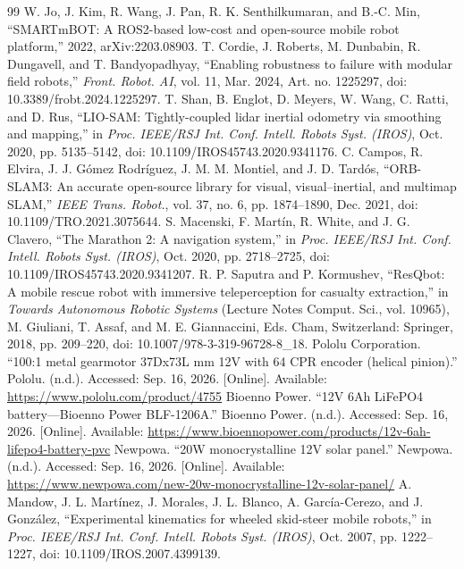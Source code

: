 \begin{thebibliography}{99}
W. Jo, J. Kim, R. Wang, J. Pan, R. K. Senthilkumaran, and B.-C. Min, ``SMARTmBOT: A ROS2-based low-cost and open-source mobile robot platform,'' 2022, arXiv:2203.08903.
T. Cordie, J. Roberts, M. Dunbabin, R. Dungavell, and T. Bandyopadhyay, ``Enabling robustness to failure with modular field robots,'' \textit{Front. Robot. AI}, vol. 11, Mar. 2024, Art. no. 1225297, doi: 10.3389/frobt.2024.1225297.
T. Shan, B. Englot, D. Meyers, W. Wang, C. Ratti, and D. Rus, ``LIO-SAM: Tightly-coupled lidar inertial odometry via smoothing and mapping,'' in \textit{Proc. IEEE/RSJ Int. Conf. Intell. Robots Syst. (IROS)}, Oct. 2020, pp. 5135--5142, doi: 10.1109/IROS45743.2020.9341176.
C. Campos, R. Elvira, J. J. G\'{o}mez Rodr\'{i}guez, J. M. M. Montiel, and J. D. Tard\'{o}s, ``ORB-SLAM3: An accurate open-source library for visual, visual--inertial, and multimap SLAM,'' \textit{IEEE Trans. Robot.}, vol. 37, no. 6, pp. 1874--1890, Dec. 2021, doi: 10.1109/TRO.2021.3075644.
S. Macenski, F. Mart\'{i}n, R. White, and J. G. Clavero, ``The Marathon 2: A navigation system,'' in \textit{Proc. IEEE/RSJ Int. Conf. Intell. Robots Syst. (IROS)}, Oct. 2020, pp. 2718--2725, doi: 10.1109/IROS45743.2020.9341207.
R. P. Saputra and P. Kormushev, ``ResQbot: A mobile rescue robot with immersive teleperception for casualty extraction,'' in \textit{Towards Autonomous Robotic Systems} (Lecture Notes Comput. Sci., vol. 10965), M. Giuliani, T. Assaf, and M. E. Giannaccini, Eds. Cham, Switzerland: Springer, 2018, pp. 209--220, doi: 10.1007/978-3-319-96728-8\_18.
Pololu Corporation. ``100:1 metal gearmotor 37Dx73L mm 12V with 64 CPR encoder (helical pinion).'' Pololu. (n.d.). Accessed: Sep. 16, 2026. [Online]. Available: \url{https://www.pololu.com/product/4755}
Bioenno Power. ``12V 6Ah LiFePO4 battery---Bioenno Power BLF-1206A.'' Bioenno Power. (n.d.). Accessed: Sep. 16, 2026. [Online]. Available: \url{https://www.bioennopower.com/products/12v-6ah-lifepo4-battery-pvc}
Newpowa. ``20W monocrystalline 12V solar panel.'' Newpowa. (n.d.). Accessed: Sep. 16, 2026. [Online]. Available: \url{https://www.newpowa.com/new-20w-monocrystalline-12v-solar-panel/}
A. Mandow, J. L. Mart\'{i}nez, J. Morales, J. L. Blanco, A. Garc\'{i}a-Cerezo, and J. Gonz\'{a}lez, ``Experimental kinematics for wheeled skid-steer mobile robots,'' in \textit{Proc. IEEE/RSJ Int. Conf. Intell. Robots Syst. (IROS)}, Oct. 2007, pp. 1222--1227, doi: 10.1109/IROS.2007.4399139.

\end{thebibliography}
